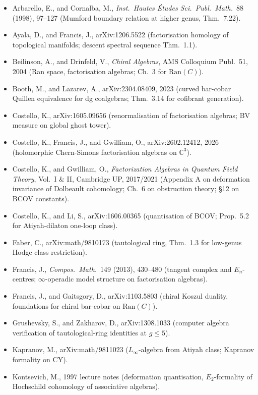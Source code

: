 \documentclass[11pt]{amsart}
\newcommand{\Ran}{\mathrm{Ran}}
\newcommand{\bC}{\mathbb{C}}
\begin{document}
\begin{itemize}
\item Arbarello, E., and Cornalba, M., \emph{Inst.\ Hautes
Études Sci.\ Publ.\ Math.}\ 88 (1998), 97--127 (Mumford
boundary relation at higher genus, Thm.\ 7.22).
\item Ayala, D., and Francis, J., arXiv:1206.5522 (factorisation
homology of topological manifolds; descent spectral sequence
Thm.\ 1.1).
\item Beilinson, A., and Drinfeld, V., \emph{Chiral Algebras}, AMS
Colloquium Publ.\ 51, 2004 (Ran space, factorisation algebras;
Ch.~3 for $\Ran(C)$).
\item Booth, M., and Lazarev, A., arXiv:2304.08409, 2023 (curved
bar-cobar Quillen equivalence for dg coalgebras; Thm.\ 3.14 for
cofibrant generation).
\item Costello, K., arXiv:1605.09656 (renormalisation of
factorisation algebras; BV measure on global ghost tower).
\item Costello, K., Francis, J., and Gwilliam, O., arXiv:2602.12412, 2026
(holomorphic Chern-Simons factorisation algebras on $\bC^3$).
\item Costello, K., and Gwilliam, O., \emph{Factorization Algebras in
Quantum Field Theory}, Vol.~I \& II, Cambridge UP, 2017/2021
(Appendix A on deformation invariance of Dolbeault cohomology;
Ch.~6 on obstruction theory; \S12 on BCOV constants).
\item Costello, K., and Li, S., arXiv:1606.00365 (quantisation of
BCOV; Prop.~5.2 for Atiyah-dilaton one-loop class).
\item Faber, C., arXiv:math/9810173 (tautological ring, Thm.~1.3 for
low-genus Hodge class restriction).
\item Francis, J., \emph{Compos.\ Math.}\ 149 (2013), 430--480
(tangent complex and $E_n$-centres; $\infty$-operadic model
structure on factorisation algebras).
\item Francis, J., and Gaitsgory, D., arXiv:1103.5803 (chiral
Koszul duality, foundations for chiral bar-cobar on $\Ran(C)$).
\item Grushevsky, S., and Zakharov, D., arXiv:1308.1033 (computer
algebra verification of tautological-ring identities at
$g \leq 5$).
\item Kapranov, M., arXiv:math/9811023 ($L_\infty$-algebra from
Atiyah class; Kapranov formality on CY).
\item Kontsevich, M., 1997 lecture notes (deformation quantisation,
$E_2$-formality of Hochschild cohomology of associative algebras).

\end{itemize}
\end{document}
